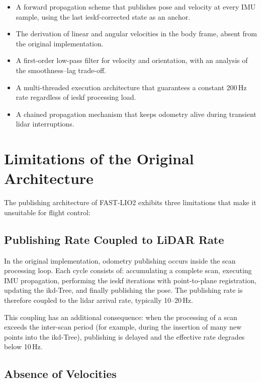 \begin{itemize}
    \item A forward propagation scheme that publishes pose and velocity at every
    IMU sample, using the last \gls{ieskf}-corrected state as an anchor.
    \item The derivation of linear and angular velocities in the body frame,
    absent from the original implementation.
    \item A first-order low-pass filter for velocity and orientation, with an
    analysis of the smoothness--lag trade-off.
    \item A multi-threaded execution architecture that guarantees a constant
    200\,Hz rate regardless of \gls{ieskf} processing load.
    \item A chained propagation mechanism that keeps odometry alive during
    transient \gls{lidar} interruptions.
\end{itemize}

\section{Limitations of the Original Architecture}
\label{sec:fr-limitations}

The publishing architecture of FAST-LIO2 exhibits three limitations that make it
unsuitable for flight control:

\subsection{Publishing Rate Coupled to LiDAR Rate}
\label{sec:fr-coupling}

In the original implementation, odometry publishing occurs inside the scan
processing loop. Each cycle consists of: accumulating a complete scan, executing
IMU propagation, performing the \gls{ieskf} iterations with point-to-plane
registration, updating the ikd-Tree, and finally publishing the pose. The
publishing rate is therefore coupled to the \gls{lidar} arrival rate, typically
10--20\,Hz.

This coupling has an additional consequence: when the processing of a scan exceeds
the inter-scan period (for example, during the insertion of many new points into
the ikd-Tree), publishing is delayed and the effective rate degrades below 10\,Hz.

\subsection{Absence of Velocities}
\label{sec:fr-no-velocity}

